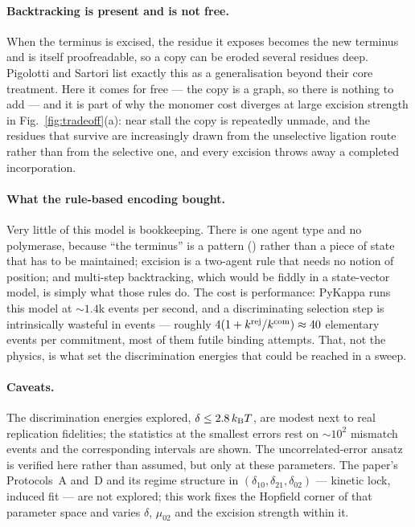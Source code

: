 \paragraph{Backtracking is present and is not free.}  When the terminus is excised, the
residue it exposes becomes the new terminus and is itself proofreadable, so a copy can
be eroded several residues deep.  Pigolotti and Sartori list exactly this as a
generalisation beyond their core treatment.  Here it comes for free --- the copy is a
graph, so there is nothing to add --- and it is part of why the monomer cost diverges
at large excision strength in Fig.~\ref{fig:tradeoff}(a): near stall the copy is
repeatedly unmade, and the residues that survive are increasingly drawn from the
unselective ligation route rather than from the selective one, and every excision
throws away a completed incorporation.

\paragraph{What the rule-based encoding bought.}  Very little of this model is
bookkeeping.  There is one agent type and no polymerase, because ``the terminus'' is a
pattern () rather than a piece of state that has to be maintained;
excision is a two-agent rule that needs no notion of position; and multi-step
backtracking, which would be fiddly in a state-vector model, is simply what those rules
do.  The cost is performance: PyKappa runs this model at $\sim\!1.4$k events per second,
and a discriminating selection step is intrinsically wasteful in events --- roughly
$4(1+k^{\rm rej}/k^{\rm com})\approx40$ elementary events per commitment, most of them
futile binding attempts.  That, not the physics, is what set the discrimination energies
that could be reached in a sweep.

\paragraph{Caveats.}  The discrimination energies explored, $\delta\le2.8\,k_\mathrm{B} T$, are
modest next to real replication fidelities; the statistics at the smallest errors rest on
$\sim\!10^{2}$ mismatch events and the corresponding intervals are shown.  The
uncorrelated-error ansatz is verified here rather than assumed, but only at these
parameters.  The paper's Protocols~A and~D and its regime structure in
$(\delta_{10},\delta_{21},\delta_{02})$ --- kinetic lock, induced fit --- are not explored;
this work fixes the Hopfield corner of that parameter space and varies $\delta$,
$\mu_{02}$ and the excision strength within it.

